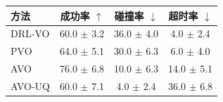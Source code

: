 \begin{tabular}{lccc}
\toprule
方法 & 成功率 $\uparrow$ & 碰撞率 $\downarrow$ & 超时率 $\downarrow$ \\
\midrule
DRL-VO & 60.0 $\pm$ 3.2 & 36.0 $\pm$ 4.0 & 4.0 $\pm$ 2.4 \\
PVO & 64.0 $\pm$ 5.1 & 30.0 $\pm$ 6.3 & 6.0 $\pm$ 4.0 \\
AVO & 76.0 $\pm$ 6.8 & 10.0 $\pm$ 6.3 & 14.0 $\pm$ 5.1 \\
AVO-UQ & 60.0 $\pm$ 7.1 & 4.0 $\pm$ 2.4 & 36.0 $\pm$ 6.8 \\
\bottomrule
\end{tabular}
